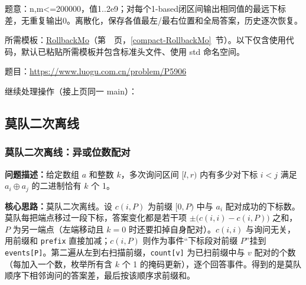 \label{usage-example-355}

题意：n,m<=200000，值1..2e9；对每个1-based闭区间输出相同值的最远下标差，无重复输出0。离散化，保存各值最左/最右位置和全局答案，历史逐次恢复。

所需模板：\hyperref[compact-RollbackMo]{RollbackMo}（第~\pageref{compact-RollbackMo}~页，\ref{compact-RollbackMo}~节）。以下仅含使用代码，默认已粘贴所需模板并包含标准头文件、使用 std 命名空间。

题目：\url{https://www.luogu.com.cn/problem/P5906}



\newpage

\noindent 继续处理操作（接上页同一 main）：



\Needspace{180pt}

\subsection{莫队二次离线}

\subsubsection{莫队二次离线：异或位数配对}\label{compact-xor_hamming_pairs}

\noindent\textbf{问题描述：}\allowbreak 给定数组 $a$ 和整数 $k$，多次询问区间 $[l,r)$ 内有多少对下标 $i<j$ 满足 $a_i\oplus a_j$ 的二进制恰有 $k$ 个 1。

\textbf{核心思路：}\allowbreak 莫队二次离线。设 $c(i,P)$ 为前缀 $[0,P)$ 中与 $a_i$ 配对成功的下标数。莫队每把端点移过一段下标，答案变化都是若干项 $\pm\bigl(c(i,i)-c(i,P)\bigr)$ 之和，$P$ 为另一端点（左端移动且 $k=0$ 时还要扣掉自身配对）。$c(i,i)$ 与询问无关，用前缀和 \texttt{prefix} 直接加减；$c(i,P)$ 则作为事件“下标段对前缀 $P$”挂到 \texttt{events[P]}。第二遍从左到右扫描前缀，\texttt{count[v]} 为已扫前缀中与 $v$ 配对的个数（每加入一个数，枚举所有含 $k$ 个 1 的掩码更新），逐个回答事件。得到的是莫队顺序下相邻询问的答案差，最后按该顺序求前缀和。

